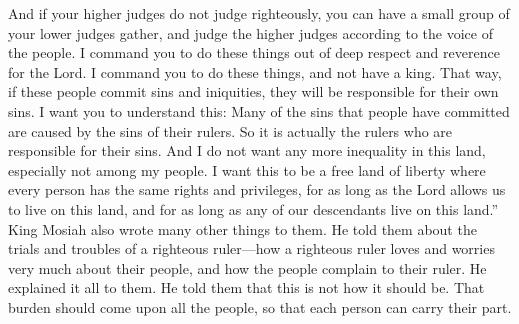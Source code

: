And if your higher judges do not judge righteously, you can have a small group of your lower judges gather, and judge the higher judges according to the voice of the people.
\bverse \iffalse And I command you to do these things in the fear of the Lord; and I command you to do these things, and that ye have no king; that if these people commit sins and iniquities they shall be answered upon their own heads. \fi
I command you to do these things out of deep respect and reverence for the Lord. I command you to do these things, and not have a king. That way, if these people commit sins and iniquities, they will be responsible for their own sins.
\bverse \iffalse For behold I say unto you, the sins of many people have been caused by the iniquities of their kings; therefore their iniquities are answered upon the heads of their kings. \fi
I want you to understand this: Many of the sins that people have committed are caused by the sins of their rulers.  So it is actually the rulers who are responsible for their sins.
\bverse \iffalse And now I desire that this inequality should be no more in this land, especially among this my people; but I desire that this land be a land of liberty, and every man may enjoy his rights and privileges alike, so long as the Lord sees fit that we may live and inherit the land, yea, even as long as any of our posterity remains upon the face of the land. \fi
And I do not want any more inequality in this land, especially not among my people. I want this to be a free land of liberty where every person has the same rights and privileges, for as long as the Lord allows us to live on this land, and for as long as any of our descendants live on this land.''
\bverse \iffalse And many more things did king Mosiah write unto them, unfolding unto them all the trials and troubles of a righteous king, yea, all the travails of soul for their people, and also all the murmurings of the people to their king; and he explained it all unto them. \fi
King Mosiah also wrote many other things to them. He told them about the trials and troubles of a righteous ruler---how a righteous ruler loves and worries very much about their people, and how the people complain to their ruler. He explained it all to them.
\bverse \iffalse And he told them that these things ought not to be; but that the burden should come upon all the people, that every man might bear his part. \fi
He told them that this is not how it should be. That burden should come upon all the people, so that each person can carry their part.
